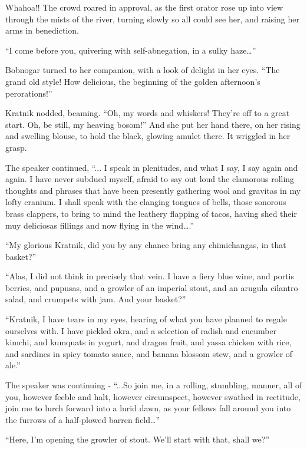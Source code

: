 
Whahoa!! The crowd roared in approval, as the first orator rose up into
view through the mists of the river, turning slowly so all could see
her, and raising her arms in benediction.

``I come before you, quivering with self-abnegation, in a sulky
haze\ldots{}''

Bobnogar turned to her companion, with a look of delight in her eyes.
``The grand old style! How delicious, the beginning of the golden
afternoon's perorations!''

Kratnik nodded, beaming. ``Oh, my words and whiskers! They're off to a
great start. Oh, be still, my heaving bosom!'' And she put her hand
there, on her rising and swelling blouse, to hold the black, glowing
amulet there. It wriggled in her grasp.

The speaker continued, ``... I speak in plenitudes, and what I say, I
say again and again. I have never subdued myself, afraid to say out loud
the clamorous rolling thoughts and phrases that have been presently
gathering wool and gravitas in my lofty cranium. I shall speak with the
clanging tongues of bells, those sonorous brass clappers, to bring to
mind the leathery flapping of tacos, having shed their muy deliciosas
fillings and now flying in the wind\ldots{}.''

``My glorious Kratnik, did you by any chance bring any chimichangas, in
that basket?''

``Alas, I did not think in precisely that vein. I have a fiery blue
wine, and portis berries, and pupusas, and a growler of an imperial
stout, and an arugula cilantro salad, and crumpets with jam. And your
basket?''

``Kratnik, I have tears in my eyes, hearing of what you have planned to
regale ourselves with. I have pickled okra, and a selection of radish
and cucumber kimchi, and kumquats in yogurt, and dragon fruit, and yassa
chicken with rice, and sardines in spicy tomato sauce, and banana
blossom stew, and a growler of ale.''

The speaker was continuing - ``...So join me, in a rolling, stumbling,
manner, all of you, however feeble and halt, however circumspect,
however swathed in rectitude, join me to lurch forward into a lurid
dawn, as your fellows fall around you into the furrows of a half-plowed
barren field\ldots{}''

``Here, I'm opening the growler of stout. We'll start with that, shall
we?''

